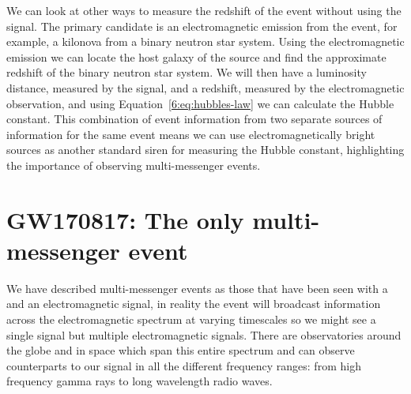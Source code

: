 We can look at other ways to measure the redshift of the event without using the \gwadj signal. The primary candidate is an electromagnetic emission from the event, for example, a kilonova from a binary neutron star system. Using the electromagnetic emission we can locate the host galaxy of the source and find the approximate redshift of the binary neutron star system. We will then have a luminosity distance, measured by the \gwadj signal, and a redshift, measured by the electromagnetic observation, and using Equation~\ref{6:eq:hubbles-law} we can calculate the Hubble constant. This combination of event information from two separate sources of information for the same event means we can use electromagnetically bright \gwadj sources as another standard siren for measuring the Hubble constant, highlighting the importance of observing multi-messenger events.

\section{\label{6:sec:gw170817}GW170817: The only multi-messenger event}

We have described multi-messenger events as those that have been seen with a \gw and an electromagnetic signal, in reality the event will broadcast information across the electromagnetic spectrum at varying timescales so we might see a single \gwadj signal but multiple electromagnetic signals. There are observatories around the globe and in space which span this entire spectrum and can observe counterparts to our \gwadj signal in all the different frequency ranges: from high frequency gamma rays to long wavelength radio waves. 

